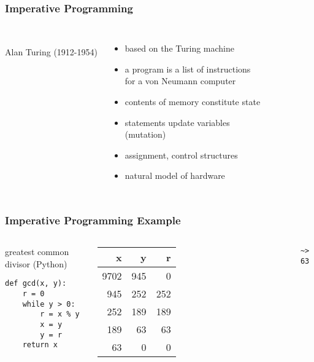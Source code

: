 \documentclass[dvipsnames]{beamer}
\theoremstyle{plain}
\begin{document}
\begin{frame}
  \frametitle{Imperative Programming}

  \begin{columns}
    \begin{center}
      \\
      Alan Turing (1912-1954)
    \end{center}

    \begin{itemize}
      \item based on the Turing machine
      \item a program is a list of instructions\\
        for a von Neumann computer
      \item contents of memory constitute \alert{state}
      \item statements update variables\\
        (\alert{mutation})
      \item assignment, control structures
      \item natural model of hardware
    \end{itemize}
  \end{columns}
\end{frame}

\begin{frame}[fragile]
  \frametitle{Imperative Programming Example}

  \begin{columns}[b]
    \begin{exampleblock}{greatest common divisor (Python)}
      \begin{lstlisting}
def gcd(x, y):
    r = 0
    while y > 0:
        r = x % y
        x = y
        y = r
    return x
      \end{lstlisting}
    \end{exampleblock}

    \begin{tabular}{|r|r|r|}\hline
   x &   y &   r\\\hline\hline
9702 & 945 &   0\\\hline
 945 & 252 & 252\\\hline
 252 & 189 & 189\\\hline
 189 &  63 &  63\\\hline
  63 &   0 &   0\\\hline
    \end{tabular}

    \medskip
    \lstinline|~> 63|
  \end{columns}
\end{frame}
\end{document}
